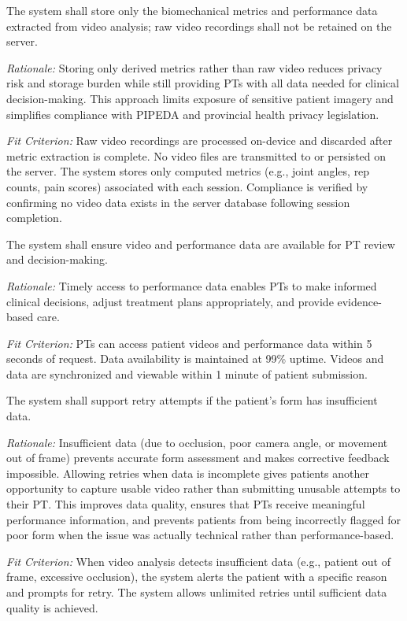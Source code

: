 \documentclass[12pt]{article}
\newcommand{\rationale}[1]{\par\emph{Rationale:} #1}
\newcommand{\fitcrit}[1]{\par\emph{Fit Criterion:} #1}
\begin{document}
\begin{reqlist}
	\item[FR 24.] The system shall store only the biomechanical metrics and performance data extracted from video analysis; raw video recordings shall not be retained on the server.
	\rationale{Storing only derived metrics rather than raw video reduces privacy risk and storage burden while still providing PTs with all data needed for clinical decision-making. This approach limits exposure of sensitive patient imagery and simplifies compliance with PIPEDA and provincial health privacy legislation.}
	\fitcrit{Raw video recordings are processed on-device and discarded after metric extraction is complete. No video files are transmitted to or persisted on the server. The system stores only computed metrics (e.g., joint angles, rep counts, pain scores) associated with each session. Compliance is verified by confirming no video data exists in the server database following session completion.}
	
	\item[FR 25.] The system shall ensure video and performance data are available for PT review and decision-making.
	\rationale{Timely access to performance data enables PTs to make informed clinical decisions, adjust treatment plans appropriately, and provide evidence-based care.}
	\fitcrit{PTs can access patient videos and performance data within 5 seconds of request. Data availability is maintained at 99\% uptime. Videos and data are synchronized and viewable within 1 minute of patient submission.}
	
	\item[FR 26.] The system shall support retry attempts if the patient's form has insufficient data.
	\rationale{Insufficient data (due to occlusion, poor camera angle, or movement out of frame) prevents accurate form assessment and makes corrective feedback impossible. Allowing retries when data is incomplete gives patients another opportunity to capture usable video rather than submitting unusable attempts to their PT. This improves data quality, ensures that PTs receive meaningful performance information, and prevents patients from being incorrectly flagged for poor form when the issue was actually technical rather than performance-based.}
	\fitcrit{When video analysis detects insufficient data (e.g., patient out of frame, excessive occlusion), the system alerts the patient with a specific reason and prompts for retry. The system allows unlimited retries until sufficient data quality is achieved.}
	

\end{reqlist}
\end{document}
